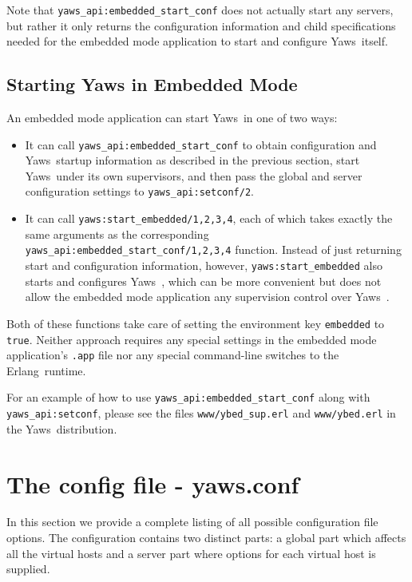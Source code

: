 \documentclass[11pt,oneside,english]{book}
\newcommand{\Erlang}            %
        {{\sc Erlang}}
\newcommand{\Yaws}            %
        {{\sc Yaws}}
\begin{document}
Note that \verb+yaws_api:embedded_start_conf+ does not actually start
any servers, but rather it only returns the configuration information
and child specifications needed for the embedded mode application to
start and configure \Yaws\  itself.

\section{Starting Yaws in Embedded Mode}

An embedded mode application can start \Yaws\  in one of two ways:

\begin{itemize}

\item It can call \verb+yaws_api:embedded_start_conf+ to obtain
  configuration and \Yaws\  startup information as described in the
  previous section, start \Yaws\  under its own supervisors, and then
  pass the global and server configuration settings to
  \verb+yaws_api:setconf/2+.

\item It can call \verb+yaws:start_embedded/1,2,3,4+, each of which
  takes exactly the same arguments as the corresponding
  \verb+yaws_api:embedded_start_conf/1,2,3,4+ function. Instead of just
  returning start and configuration information, however,
  \verb+yaws:start_embedded+ also starts and configures \Yaws\ , which
  can be more convenient but does not allow the embedded mode
  application any supervision control over \Yaws\ .

\end{itemize}

Both of these functions take care of setting the environment key
\verb+embedded+ to \verb+true+. Neither approach requires any special
settings in the embedded mode application's \verb+.app+ file nor any
special command-line switches to the \Erlang\  runtime.

For an example of how to use \verb+yaws_api:embedded_start_conf+ along
with \verb+yaws_api:setconf+, please see the files
\verb+www/ybed_sup.erl+ and \verb+www/ybed.erl+ in the
\Yaws\  distribution.

\chapter{The config file - yaws.conf}

In this section we provide a complete listing of all possible
configuration file options.  The configuration contains two distinct
parts: a global part which affects all the virtual hosts and a server
part where options for each virtual host is supplied.
\end{document}
